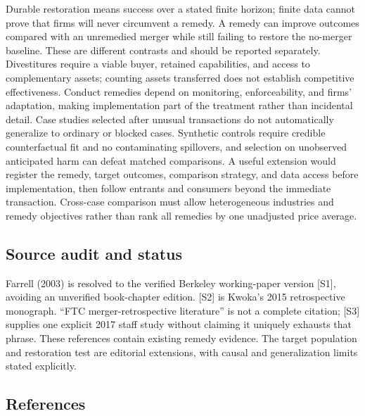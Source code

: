 \documentclass[11pt,a4paper]{article}
\begin{document}
Durable restoration means success over a stated finite horizon; finite data cannot prove that firms will never circumvent a remedy. A remedy can improve outcomes compared with an unremedied merger while still failing to restore the no-merger baseline. These are different contrasts and should be reported separately. Divestitures require a viable buyer, retained capabilities, and access to complementary assets; counting assets transferred does not establish competitive effectiveness. Conduct remedies depend on monitoring, enforceability, and firms' adaptation, making implementation part of the treatment rather than incidental detail. Case studies selected after unusual transactions do not automatically generalize to ordinary or blocked cases. Synthetic controls require credible counterfactual fit and no contaminating spillovers, and selection on unobserved anticipated harm can defeat matched comparisons. A useful extension would register the remedy, target outcomes, comparison strategy, and data access before implementation, then follow entrants and consumers beyond the immediate transaction. Cross-case comparison must allow heterogeneous industries and remedy objectives rather than rank all remedies by one unadjusted price average.

\subsection*{Source audit and status}

Farrell (2003) is resolved to the verified Berkeley working-paper version [S1], avoiding an unverified book-chapter edition. [S2] is Kwoka's 2015 retrospective monograph. ``FTC merger-retrospective literature'' is not a complete citation; [S3] supplies one explicit 2017 staff study without claiming it uniquely exhausts that phrase. These references contain existing remedy evidence. The target population and restoration test are editorial extensions, with causal and generalization limits stated explicitly.

\subsection*{References}
\end{document}
